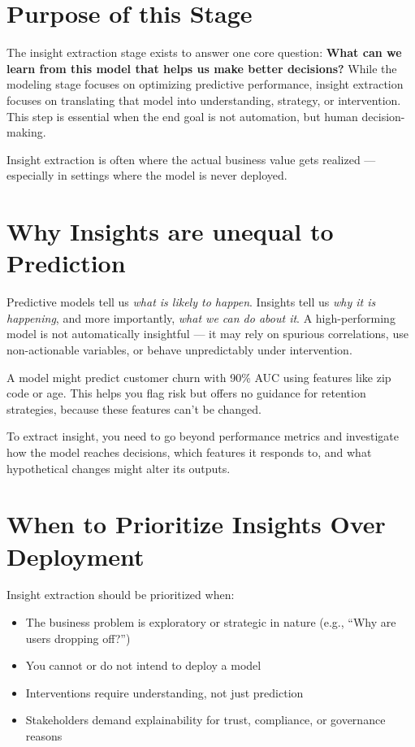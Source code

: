 \documentclass[12pt,openany]{book}
\begin{document}
\section{Purpose of this Stage}

The insight extraction stage exists to answer one core question: \textbf{What can we learn from this model that helps us make better decisions?} While the modeling stage focuses on optimizing predictive performance, insight extraction focuses on translating that model into understanding, strategy, or intervention. This step is essential when the end goal is not automation, but human decision-making.

\begin{notebox}
Insight extraction is often where the actual business value gets realized — especially in settings where the model is never deployed.
\end{notebox}



\section{Why Insights are unequal to Prediction}

Predictive models tell us \emph{what is likely to happen}. Insights tell us \emph{why it is happening}, and more importantly, \emph{what we can do about it}. A high-performing model is not automatically insightful — it may rely on spurious correlations, use non-actionable variables, or behave unpredictably under intervention.

\begin{examplebox}
A model might predict customer churn with 90\% AUC using features like zip code or age. This helps you flag risk but offers no guidance for retention strategies, because these features can’t be changed.
\end{examplebox}

To extract insight, you need to go beyond performance metrics and investigate how the model reaches decisions, which features it responds to, and what hypothetical changes might alter its outputs.



\section{When to Prioritize Insights Over Deployment}

Insight extraction should be prioritized when:
\begin{itemize}
  \item The business problem is exploratory or strategic in nature (e.g., ``Why are users dropping off?'')
  \item You cannot or do not intend to deploy a model
  \item Interventions require understanding, not just prediction
  \item Stakeholders demand explainability for trust, compliance, or governance reasons
\end{itemize}
\end{document}
